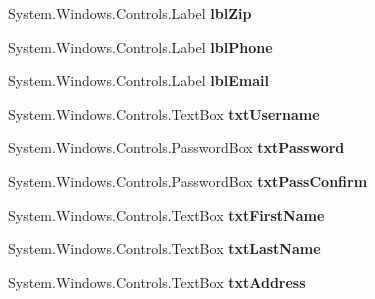 \begin{DoxyCompactItemize}
\item 
System.\+Windows.\+Controls.\+Label {\bfseries lbl\+Zip}\hypertarget{class_p_c_builder_forms_1_1_log_in_a95335e4f306d140c479af8d212d1c59a}{}\label{class_p_c_builder_forms_1_1_log_in_a95335e4f306d140c479af8d212d1c59a}

\item 
System.\+Windows.\+Controls.\+Label {\bfseries lbl\+Phone}\hypertarget{class_p_c_builder_forms_1_1_log_in_a8bfcacc207daa48f971cf88164c74f56}{}\label{class_p_c_builder_forms_1_1_log_in_a8bfcacc207daa48f971cf88164c74f56}

\item 
System.\+Windows.\+Controls.\+Label {\bfseries lbl\+Email}\hypertarget{class_p_c_builder_forms_1_1_log_in_a9f5d1f353476f6b81dd5c23226d3fb6a}{}\label{class_p_c_builder_forms_1_1_log_in_a9f5d1f353476f6b81dd5c23226d3fb6a}

\item 
System.\+Windows.\+Controls.\+Text\+Box {\bfseries txt\+Username}\hypertarget{class_p_c_builder_forms_1_1_log_in_aa9446489f0e9e0896303b3430fade22d}{}\label{class_p_c_builder_forms_1_1_log_in_aa9446489f0e9e0896303b3430fade22d}

\item 
System.\+Windows.\+Controls.\+Password\+Box {\bfseries txt\+Password}\hypertarget{class_p_c_builder_forms_1_1_log_in_a0b81eaa25cb2868469292fa55b51d76c}{}\label{class_p_c_builder_forms_1_1_log_in_a0b81eaa25cb2868469292fa55b51d76c}

\item 
System.\+Windows.\+Controls.\+Password\+Box {\bfseries txt\+Pass\+Confirm}\hypertarget{class_p_c_builder_forms_1_1_log_in_ac6db00a879be9036ed5582977d99e54c}{}\label{class_p_c_builder_forms_1_1_log_in_ac6db00a879be9036ed5582977d99e54c}

\item 
System.\+Windows.\+Controls.\+Text\+Box {\bfseries txt\+First\+Name}\hypertarget{class_p_c_builder_forms_1_1_log_in_a0a3383d92461671843f1e81bf3c1ba7f}{}\label{class_p_c_builder_forms_1_1_log_in_a0a3383d92461671843f1e81bf3c1ba7f}

\item 
System.\+Windows.\+Controls.\+Text\+Box {\bfseries txt\+Last\+Name}\hypertarget{class_p_c_builder_forms_1_1_log_in_aff9a595a21cb6de8311772d714ee3baf}{}\label{class_p_c_builder_forms_1_1_log_in_aff9a595a21cb6de8311772d714ee3baf}

\item 
System.\+Windows.\+Controls.\+Text\+Box {\bfseries txt\+Address}\hypertarget{class_p_c_builder_forms_1_1_log_in_a058d08c9916e931de9e971766c46aa5a}{}\label{class_p_c_builder_forms_1_1_log_in_a058d08c9916e931de9e971766c46aa5a}


\end{DoxyCompactItemize}
